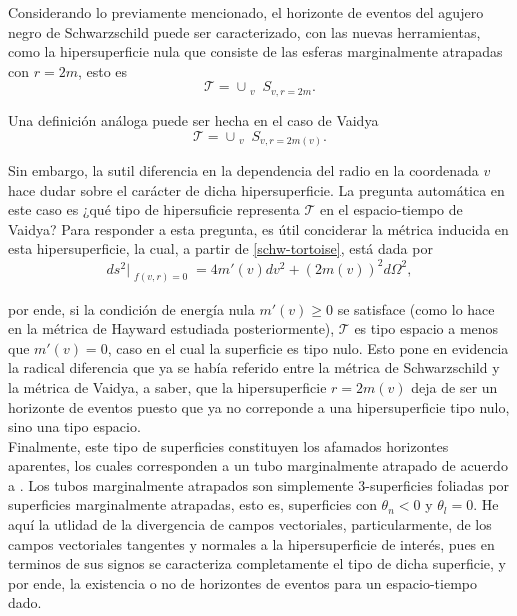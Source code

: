 \documentclass{article}
\numberwithin{equation}{section}
\theoremstyle{definition}
\begin{document}
\newpage
Considerando lo previamente mencionado, el horizonte de eventos del agujero negro de Schwarzschild puede ser caracterizado, con las nuevas herramientas, como la hipersuperficie nula que consiste de las esferas marginalmente atrapadas con $r = 2m$, esto es
\begin{equation*}
\mathcal{T} = \cup_{\substack{v}}S_{v,r = 2m}.
\end{equation*}

Una definición análoga puede ser hecha en el caso de Vaidya  
\begin{equation*}
\mathcal{T} = \cup_{\substack{v}}S_{v,r = 2m(v)}.
\end{equation*}

Sin embargo, la sutil diferencia en la dependencia del radio en la coordenada $v$ hace dudar sobre el carácter de dicha hipersuperficie. La pregunta automática en este caso es ¿qué tipo de hipersuficie representa $\mathcal{T}$ en el espacio-tiempo de Vaidya? Para responder a esta pregunta, es útil conciderar la métrica inducida en esta hipersuperficie, la cual, a partir de \eqref{schw-tortoise}, está dada por\\
\begin{equation}
\label{ind vaiya}
ds^2|_{\substack{f(v,r)=0}} = 4m'(v)dv^2 + (2m(v))^2d\Omega^2,
\end{equation}

por ende, si la condición de energía nula $m'(v) \geq 0$ se satisface (como lo hace en la métrica de Hayward estudiada posteriormente), $\mathcal{T}$ es tipo espacio a menos que $m'(v) = 0$, caso en el cual la superficie es tipo nulo. Esto pone en evidencia la radical diferencia que ya se había referido entre la métrica de Schwarzschild y la métrica de Vaidya, a saber, que la hipersuperficie $r = 2m(v)$ deja de ser un horizonte de eventos puesto que ya no correponde a una hipersuperficie tipo nulo, sino una tipo espacio.\\

Finalmente, este tipo de superficies constituyen los afamados horizontes aparentes, los cuales corresponden a un tubo marginalmente atrapado de acuerdo a \cite{blau}. Los tubos marginalmente atrapados son simplemente 3-superficies foliadas por superficies marginalmente atrapadas, esto es, superficies con $\theta_n <0$ y $\theta_l = 0$. He aquí la utlidad de la divergencia de campos vectoriales, particularmente, de los campos vectoriales tangentes y normales a la hipersuperficie de interés, pues en terminos de sus signos se caracteriza completamente el tipo de dicha superficie, y por ende, la existencia o no de horizontes de eventos para un espacio-tiempo dado.	
\end{document}
